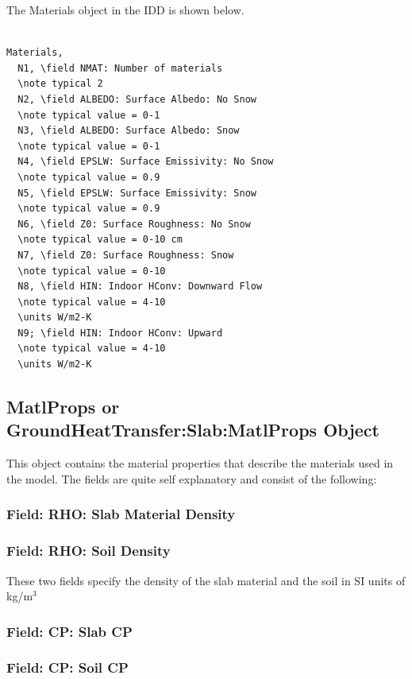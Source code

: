 The Materials object in the IDD is shown below.

\begin{lstlisting}

Materials,
  N1, \field NMAT: Number of materials
  \note typical 2
  N2, \field ALBEDO: Surface Albedo: No Snow
  \note typical value = 0-1
  N3, \field ALBEDO: Surface Albedo: Snow
  \note typical value = 0-1
  N4, \field EPSLW: Surface Emissivity: No Snow
  \note typical value = 0.9
  N5, \field EPSLW: Surface Emissivity: Snow
  \note typical value = 0.9
  N6, \field Z0: Surface Roughness: No Snow
  \note typical value = 0-10 cm
  N7, \field Z0: Surface Roughness: Snow
  \note typical value = 0-10
  N8, \field HIN: Indoor HConv: Downward Flow
  \note typical value = 4-10
  \units W/m2-K
  N9; \field HIN: Indoor HConv: Upward
  \note typical value = 4-10
  \units W/m2-K
\end{lstlisting}

\subsection{MatlProps or GroundHeatTransfer:Slab:MatlProps Object}\label{matlprops-or-groundheattransferslabmatlprops-object}

This object contains the material properties that describe the materials used in the model. The fields are quite self explanatory and consist of the following:

\subsubsection{Field: RHO: Slab Material Density}\label{field-rho-slab-material-density}

\subsubsection{Field: RHO: Soil Density}\label{field-rho-soil-density}

These two fields specify the density of the slab material and the soil in SI units of kg/m\(^{3}\)

\subsubsection{Field: CP: Slab CP}\label{field-cp-slab-cp}

\subsubsection{Field: CP: Soil CP}\label{field-cp-soil-cp}

